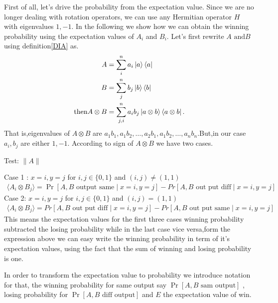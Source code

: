 First of all, let's drive the probability from the expectation value. Since we are no longer dealing with rotation operators, we can use any Hermitian  operator $H$
with eigenvalues $1,-1$. In the following we show how we can obtain the winning probability using the expectation values of $A_i$ and $B_i$.
Let's first rewrite $A\text{ and} B$ using definition\ref{DIA} as.
\begin{align}\label{NEED}
A&=\sum_i^n a_i \ket{a}\bra{a}\nonumber\\
B&=\sum_j^n  b_j \ket{b}\bra{b}\nonumber\\
\text{then} A\otimes B&=\sum_{j,i}^n  a_i b_j \ket{a\otimes b}\bra{a \otimes b}.
\end{align}
That is,eigenvalues of $A\otimes B$ are $a_1 b_1 ,a_1b_2,\ldots,a_2 b_1,a_1 b_2,\ldots, a_n b_n$.But,in our case $a_i,b_j$ are either $1,-1$. According to sign of $A\otimes B$ we have two cases.



Test:
$\|A\|$%

Case 1 :
$x=i,y=j$ for $i,j\in \{0,1\}$ and $(i,j)\neq (1,1)$
\begin{align*}
\langle A_i\otimes B_j \rangle=\Pr[A,B \text{ output same} \mid  x=i,y=j]-Pr[A,B \text{ out put diff}  \mid  x=i,y=j]
\end{align*}
Case 2:
$x=i,y=j$ for $i,j\in \{0,1\}$ and $(i,j)= (1,1)$
\begin{align*}
\langle A_i\otimes B_j\rangle=Pr[A,B \text{ out put diff} \mid  x=i,y=j]-Pr[A,B \text{ out put same}  \mid  x=i,y=j]
\end{align*}
This means the expectation values for  the first three  cases winning probability subtracted  the losing probability while in the last case vice versa,form the expression above we can easy write the winning probability in term of it's expectation values, using the fact that the sum of winning and losing probability  is one.

In order to transform the expectation value to probability we introduce notation for that, the winning probability for same output say $\Pr[A,B \text{ sam output}]$ , losing probability for $\Pr[A,B \text{ diff output}]$ and $E$ the expectation value of win.

